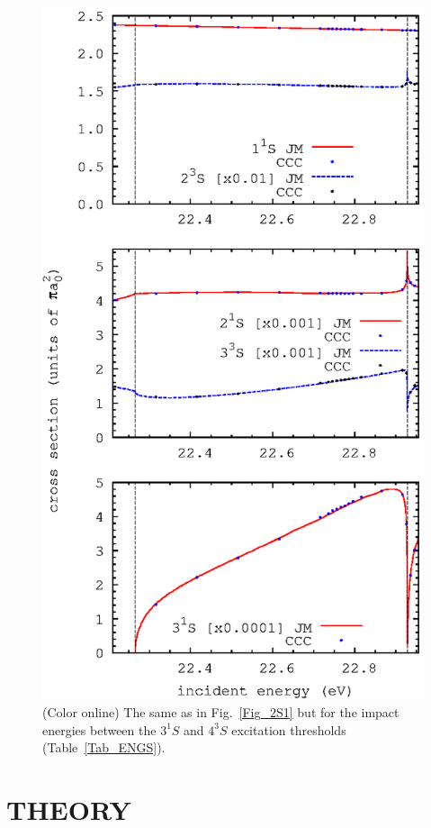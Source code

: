\documentclass[aip
, pra
, showpacs
, aps
, twocolumn
, groupedaddress
, floatfix
]{revtex4}
\begin{document}
\begin{figure}[htb]
\includegraphics[scale=1]{fig_res_3S1.ps}
\caption{(Color online) The same as in Fig.~\ref{Fig_2S1}
but for the impact energies between the $3^1S$ and $4^3S$ excitation thresholds (Table~\ref{Tab_ENGS}).
}
\label{Fig_3S1}
\end{figure}





\section{THEORY}
\end{document}
